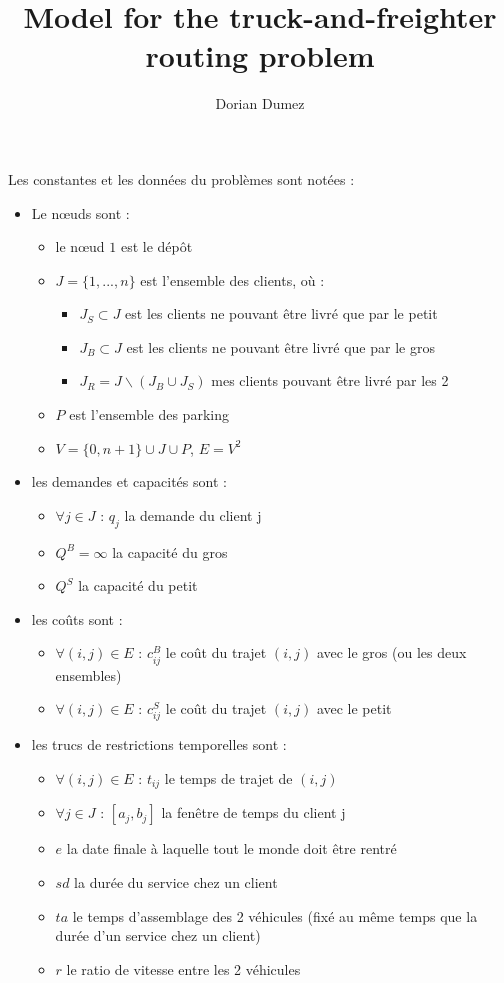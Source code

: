 \documentclass[12pt,a4paper,fleqn]{article}
\title{Model for the truck-and-freighter routing problem}
\author{Dorian Dumez}
\begin{document}
\maketitle

Les constantes et les données du problèmes sont notées :
\begin{itemize}
\item Le nœuds sont :
\begin{itemize}
\item le nœud $1$ est le dépôt 
\item $J = \{1,...,n\}$ est l'ensemble des clients, où :
\begin{itemize}
\item $J_S \subset J$ est les clients ne pouvant être livré que par le petit
\item $J_B \subset J$ est les clients ne pouvant être livré que par le gros
\item $J_R = J \backslash (J_B \cup J_S)$ mes clients pouvant être livré par les 2
\end{itemize}
\item $P$ est l'ensemble des parking
\item $V = \{0, n+1\} \cup J \cup P$, $E = V^2$
\end{itemize}
\item les demandes et capacités sont :
\begin{itemize}
\item $\forall j \in J \text{ : } q_j$ la demande du client j
\item $Q^B = \infty$ la capacité du gros
\item $Q^S$ la capacité du petit
\end{itemize}
\item les coûts sont :
\begin{itemize}
\item $\forall (i,j) \in E \text{ : } c^B_{ij}$ le coût du trajet $(i,j)$ avec le gros (ou les deux ensembles)
\item $\forall (i,j) \in E \text{ : } c^S_{ij}$ le coût du trajet $(i,j)$ avec le petit
\end{itemize} 
\item les trucs de restrictions temporelles sont :
\begin{itemize}
\item $\forall (i,j) \in E \text{ : } t_{ij}$ le temps de trajet de $(i,j)$
\item $\forall j \in J \text{ : } [a_j,b_j]$ la fenêtre de temps du client j
\item $e$ la date finale à laquelle tout le monde doit être rentré
\item $sd$ la durée du service chez un client
\item $ta$ le temps d'assemblage des 2 véhicules (fixé au même temps que la durée d'un service chez un client)
\item $r$ le ratio de vitesse entre les 2 véhicules
\end{itemize}
\end{itemize}
\end{document}
